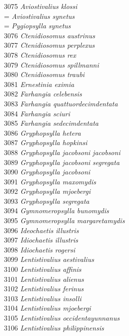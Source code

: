 \documentclass[
]{article}
\begin{document}
3075 \emph{Aviostivalius klossi}\\
= \emph{Aviostivalius synetus}\\
= \emph{Pygiopsylla synetus}\\
3076 \emph{Ctenidiosomus austrinus}\\
3077 \emph{Ctenidiosomus perplexus}\\
3078 \emph{Ctenidiosomus rex}\\
3079 \emph{Ctenidiosomus spillmanni}\\
3080 \emph{Ctenidiosomus traubi}\\
3081 \emph{Ernestinia eximia}\\
3082 \emph{Farhangia celebensis}\\
3083 \emph{Farhangia quattuordecimdentata}\\
3084 \emph{Farhangia sciuri}\\
3085 \emph{Farhangia sedecimdentata}\\
3086 \emph{Gryphopsylla hetera}\\
3087 \emph{Gryphopsylla hopkinsi}\\
3088 \emph{Gryphopsylla jacobsoni jacobsoni}\\
3089 \emph{Gryphopsylla jacobsoni segregata}\\
3090 \emph{Gryphopsylla jacobsoni}\\
3091 \emph{Gryphopsylla maxomydis}\\
3092 \emph{Gryphopsylla mjoebergi}\\
3093 \emph{Gryphopsylla segregata}\\
3094 \emph{Gymnomeropsylla bunomydis}\\
3095 \emph{Gymnomeropsylla margaretamydis}\\
3096 \emph{Ideochaetis illustris}\\
3097 \emph{Idiochaetis illustris}\\
3098 \emph{Idiochaetis rogersi}\\
3099 \emph{Lentistivalius aestivalius}\\
3100 \emph{Lentistivalius affinis}\\
3101 \emph{Lentistivalius alienus}\\
3102 \emph{Lentistivalius ferinus}\\
3103 \emph{Lentistivalius insolli}\\
3104 \emph{Lentistivalius mjoebergi}\\
3105 \emph{Lentistivalius occidentayunnanus}\\
3106 \emph{Lentistivalius philippinensis}\\
\end{document}
